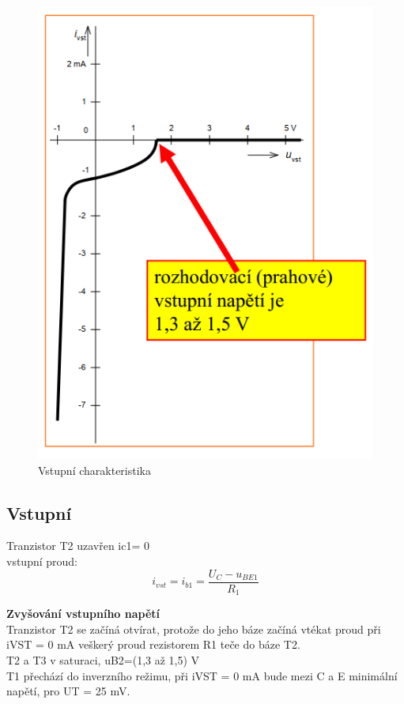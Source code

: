     \begin{figure}[h]
   \begin{center}
     \includegraphics[scale=0.6]{images/VST.png}
   \end{center}
   \caption{Vstupní charakteristika}
  \end{figure}
 \subsection{Vstupní}
 
Tranzistor T2 uzavřen ic1= 0\\
vstupní proud:
\begin{equation}
i_{vst} = i_{b1} = \frac{U_{C}-u_{BE1}}{R_{1}}
\end{equation}

\textbf{Zvyšování vstupního napětí}\\
Tranzistor T2 se začíná otvírat, protože do jeho báze začíná vtékat proud při iVST = 0 mA veškerý proud rezistorem R1 teče do báze T2.\\
T2 a T3 v saturaci, uB2=(1,3 až 1,5) V\\
T1 přechází do inverzního režimu, při iVST = 0 mA bude mezi C a E minimální napětí, pro UT = 25 mV.\\

